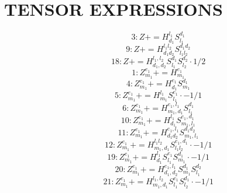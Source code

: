 \documentclass[letterpaper,10pt,fleqn,leqno,onecolumn]{article}
\begin{document}
\section{TENSOR EXPRESSIONS}
\begin{equation} \;\;\;\;\;\;  3: Z+=H^{l_{1}}_{d_{1}}S^{d_{1}}_{l_{1}} \end{equation}
\begin{equation} \;\;\;\;\;\;  9: Z+=H^{l_{1}l_{2}}_{d_{1}d_{2}}S^{d_{1}d_{2}}_{l_{1}l_{2}} \end{equation}
\begin{equation} \;\;\;\;\;\;  18: Z+=H^{l_{1},l_{2}}_{d_{1},d_{2}}S^{d_{1}}_{l_{1}}S^{d_{2}}_{l_{2}}\cdot 1/2 \end{equation}
\begin{equation} \;\;\;\;\;\;  1: Z^{e_{1}}_{m_{1}}+=H^{e_{1}}_{m_{1}} \end{equation}
\begin{equation} \;\;\;\;\;\;  4: Z^{e_{1}}_{m_{1}}+=H^{e_{1}}_{d_{1}}S^{d_{1}}_{m_{1}} \end{equation}
\begin{equation} \;\;\;\;\;\;  5: Z^{e_{1}}_{m_{1}}+=H^{l_{1}}_{m_{1}}S^{e_{1}}_{l_{1}}\cdot -1/1 \end{equation}
\begin{equation} \;\;\;\;\;\;  6: Z^{e_{1}}_{m_{1}}+=H^{e_{1},l_{1}}_{m_{1},d_{1}}S^{d_{1}}_{l_{1}} \end{equation}
\begin{equation} \;\;\;\;\;\;  10: Z^{e_{1}}_{m_{1}}+=H^{l_{1}}_{d_{1}}S^{e_{1},d_{1}}_{m_{1},l_{1}} \end{equation}
\begin{equation} \;\;\;\;\;\;  11: Z^{e_{1}}_{m_{1}}+=H^{e_{1},l_{1}}_{d_{1}d_{2}}S^{d_{1}d_{2}}_{m_{1},l_{1}} \end{equation}
\begin{equation} \;\;\;\;\;\;  12: Z^{e_{1}}_{m_{1}}+=H^{l_{1}l_{2}}_{m_{1},d_{1}}S^{e_{1},d_{1}}_{l_{1}l_{2}}\cdot -1/1 \end{equation}
\begin{equation} \;\;\;\;\;\;  19: Z^{e_{1}}_{m_{1}}+=H^{l_{1}}_{d_{1}}S^{e_{1}}_{l_{1}}S^{d_{1}}_{m_{1}}\cdot -1/1 \end{equation}
\begin{equation} \;\;\;\;\;\;  20: Z^{e_{1}}_{m_{1}}+=H^{e_{1},l_{1}}_{d_{1},d_{2}}S^{d_{1}}_{m_{1}}S^{d_{2}}_{l_{1}} \end{equation}
\begin{equation} \;\;\;\;\;\;  21: Z^{e_{1}}_{m_{1}}+=H^{l_{1},l_{2}}_{m_{1},d_{1}}S^{e_{1}}_{l_{1}}S^{d_{1}}_{l_{2}}\cdot -1/1 \end{equation}
\end{document}
